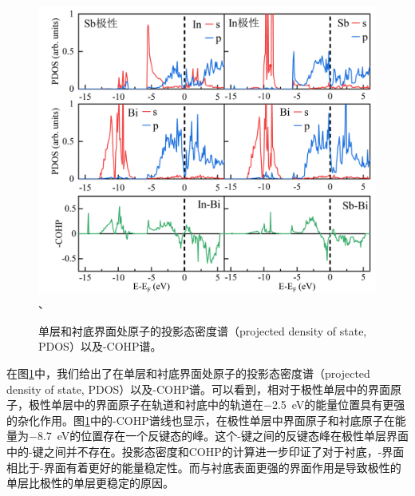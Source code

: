 \begin{figure}[htb]
    \includegraphics{pic/IS_DFT_PDOS-COHP.png}、
    \caption{单层和衬底界面处原子的投影态密度谱（projected density of state, PDOS）以及-COHP谱。 }
    \label{fig:IS_DFT_PDOS}
\end{figure}

在图\ref{fig:IS_DFT_PDOS}中，我们给出了在单层和衬底界面处原子的投影态密度谱（projected density of state, PDOS）以及-COHP谱。可以看到，相对于极性单层中的界面原子，极性单层中的界面原子在轨道和衬底中的轨道在\SI{-2.5}{\electronvolt}的能量位置具有更强的杂化作用。图\ref{fig:IS_DFT_PDOS}中的-COHP谱线也显示，在极性单层中界面原子和衬底原子在能量为\SI{-8.7}{\electronvolt}的位置存在一个反键态的峰。这个-键之间的反键态峰在极性单层界面中的-键之间并不存在。投影态密度和COHP的计算进一步印证了对于衬底，-界面相比于-界面有着更好的能量稳定性。而与衬底表面更强的界面作用是导致极性的单层比极性的单层更稳定的原因。



